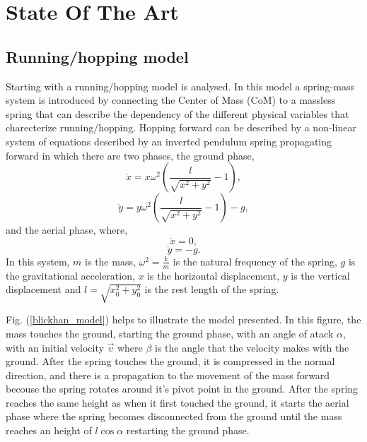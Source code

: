 \pagebreak
\section{State Of The Art}



\subsection{Running/hopping model}
Starting with \cite{Blickhan1989} a running/hopping model is analysed. In this model a spring-mass system is introduced by connecting the Center of Mass (CoM) to a massless spring that can describe the dependency of the different physical variables that charecterize running/hopping. Hopping forward can be described by a non-linear system of equations described by an inverted pendulum spring propagating forward in which there are two phases, the ground phase,
\begin{equation}
  \ddot{x}=x\omega^2\left(\frac{l}{\sqrt{x^2+y^2}}-1\right),
\end{equation}
\begin{equation}
  \ddot{y}=y\omega^2\left(\frac{l}{\sqrt{x^2+y^2}}-1\right)-g,
\end{equation}
and the aerial phase, where,
\begin{equation}
  \ddot{x}=0,
\end{equation}
\begin{equation}
  \ddot{y}=-g.
  \end{equation}
\noindent In this system, $m$ is the mass, $\omega^2=\frac{k}{m}$ is the natural frequency of the spring, $g$ is the gravitational acceleration, $x$ is the horizontal displacement, $y$ is the vertical displacement and $l=\sqrt{x_0^2+y_0^2}$ is the rest length of the spring.

\noindent Fig. (\ref{blickhan_model}) helps to illustrate the model presented. In this figure, the mass touches the ground, starting the ground phase, with an angle of atack $\alpha$, with an initial velocity $\vec{v}$ where $\beta$ is the angle that the velocity makes with the ground. After the spring touches the ground, it is compressed in the normal direction, and there is a propagation to the movement of the mass forward becouse the spring rotates around it's pivot point in the ground. After the spring reaches the same height as when it first touched the ground, it starts the aerial phase where the spring becomes disconnected from the ground until the mass reaches an height of $l \cos{\alpha}$ restarting the ground phase.  

